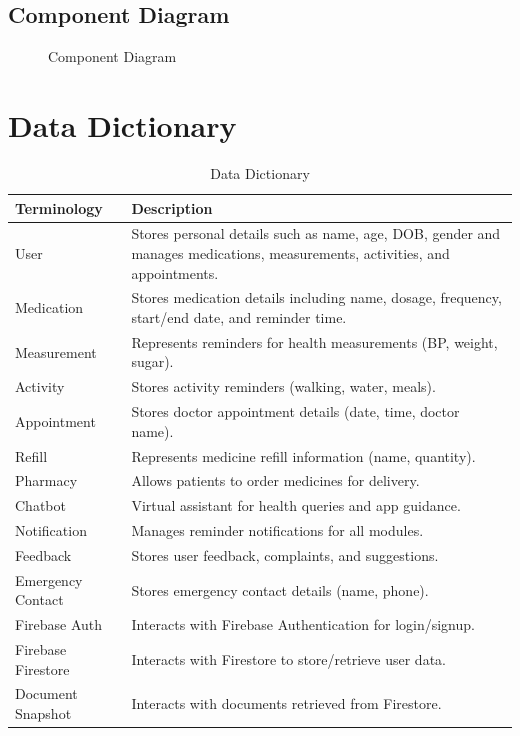 \subsection{Component Diagram}

\begin{figure}[H]
\centering
\caption{Component Diagram}
\label{fig:component-diagram}
\end{figure}

\section{Data Dictionary}

\begin{table}[H]
\centering
\caption{Data Dictionary}
\label{tab:data-dictionary}
\begin{tabularx}{\textwidth}{|l|X|}
\hline
\textbf{Terminology} & \textbf{Description} \\ \hline
User & Stores personal details such as name, age, DOB, gender and manages medications, measurements, activities, and appointments. \\ \hline
Medication & Stores medication details including name, dosage, frequency, start/end date, and reminder time. \\ \hline
Measurement & Represents reminders for health measurements (BP, weight, sugar). \\ \hline
Activity & Stores activity reminders (walking, water, meals). \\ \hline
Appointment & Stores doctor appointment details (date, time, doctor name). \\ \hline
Refill & Represents medicine refill information (name, quantity). \\ \hline
Pharmacy & Allows patients to order medicines for delivery. \\ \hline
Chatbot & Virtual assistant for health queries and app guidance. \\ \hline
Notification & Manages reminder notifications for all modules. \\ \hline
Feedback & Stores user feedback, complaints, and suggestions. \\ \hline
Emergency Contact & Stores emergency contact details (name, phone). \\ \hline
Firebase Auth & Interacts with Firebase Authentication for login/signup. \\ \hline
Firebase Firestore & Interacts with Firestore to store/retrieve user data. \\ \hline
Document Snapshot & Interacts with documents retrieved from Firestore. \\ \hline
\end{tabularx}
\end{table}

